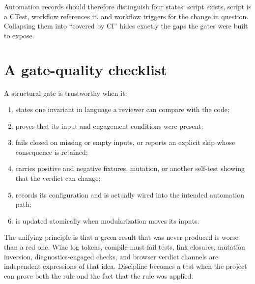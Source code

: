 Automation records should therefore distinguish four states: script exists, script is a CTest,
workflow references it, and workflow triggers for the change in question.  Collapsing them into
``covered by CI'' hides exactly the gaps the gates were built to expose.

\section{A gate-quality checklist}

A structural gate is trustworthy when it:

\begin{enumerate}
  \item states one invariant in language a reviewer can compare with the code;
  \item proves that its input and engagement conditions were present;
  \item fails closed on missing or empty inputs, or reports an explicit skip whose consequence is
        retained;
  \item carries positive and negative fixtures, mutation, or another self-test showing that the
        verdict can change;
  \item records its configuration and is actually wired into the intended automation path;
  \item is updated atomically when modularization moves its inputs.
\end{enumerate}

The unifying principle is that a green result that was never produced is worse than a red one.
Wine log tokens, compile-must-fail tests, link closures, mutation inversion, diagnostics-engaged
checks, and browser verdict channels are independent expressions of that idea.  Discipline
becomes a test when the project can prove both the rule and the fact that the rule was applied.
